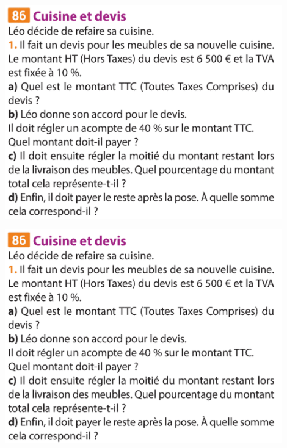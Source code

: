 \documentclass{exos}
\begin{document}
\begin{center}
\includegraphics[width=0.9\textwidth]{Exercice_Avance_TVA.png}

\vspace*{2cm}

\includegraphics[width=0.9\textwidth]{Exercice_Avance_TVA.png}
\end{center}
\end{document}
